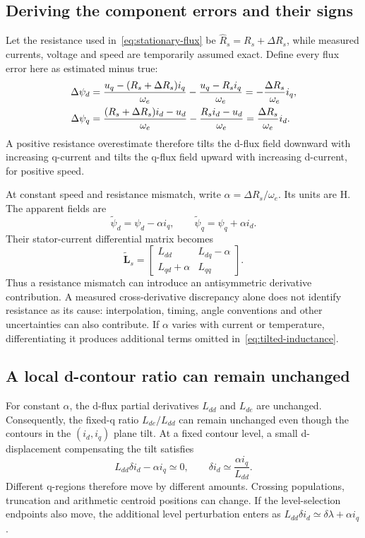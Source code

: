 \subsection{Deriving the component errors and their signs}
Let the resistance used in~\eqref{eq:stationary-flux} be $\widehat R_s=R_s+\Delta R_s$, while measured currents, voltage and speed are temporarily assumed exact. Define every flux error here as estimated minus true:
\begin{align}
\Delta\psi_d
&=\frac{u_q-(R_s+\Delta R_s)i_q}{\omega_e}
-\frac{u_q-R_si_q}{\omega_e}
=-\frac{\Delta R_s}{\omega_e}i_q,\notag\\
\Delta\psi_q
&=\frac{(R_s+\Delta R_s)i_d-u_d}{\omega_e}
-\frac{R_si_d-u_d}{\omega_e}
=\frac{\Delta R_s}{\omega_e}i_d.
\label{eq:resistance-flux-error}
\end{align}
A positive resistance overestimate therefore tilts the d-flux field downward with increasing q-current and tilts the q-flux field upward with increasing d-current, for positive speed.

At constant speed and resistance mismatch, write $\alpha=\Delta R_s/\omega_e$. Its units are H. The apparent fields are
\begin{equation}
\widetilde\psi_d=\psi_d-\alpha i_q,\qquad
\widetilde\psi_q=\psi_q+\alpha i_d.
\end{equation}
Their stator-current differential matrix becomes
\begin{equation}\label{eq:tilted-inductance}
\widetilde{\bm L}_s=
\begin{bmatrix}
L_{dd}&L_{dq}-\alpha\\
L_{qd}+\alpha&L_{qq}
\end{bmatrix}.
\end{equation}
Thus a resistance mismatch can introduce an antisymmetric derivative contribution. A measured cross-derivative discrepancy alone does not identify resistance as its cause: interpolation, timing, angle conventions and other uncertainties can also contribute. If $\alpha$ varies with current or temperature, differentiating it produces additional terms omitted in~\eqref{eq:tilted-inductance}.

\subsection{A local d-contour ratio can remain unchanged}
For constant $\alpha$, the d-flux partial derivatives $L_{dd}$ and $L_{de}$ are unchanged. Consequently, the fixed-q ratio $L_{de}/L_{dd}$ can remain unchanged even though the contours in the $(i_d,i_q)$ plane tilt. At a fixed contour level, a small d-displacement compensating the tilt satisfies
\begin{equation}
L_{dd}\delta i_d-\alpha i_q\simeq0,
\qquad
\delta i_d\simeq\frac{\alpha i_q}{L_{dd}}.
\end{equation}
Different q-regions therefore move by different amounts. Crossing populations, truncation and arithmetic centroid positions can change. If the level-selection endpoints also move, the additional level perturbation enters as
$L_{dd}\delta i_d\simeq\delta\lambda+\alpha i_q$.

